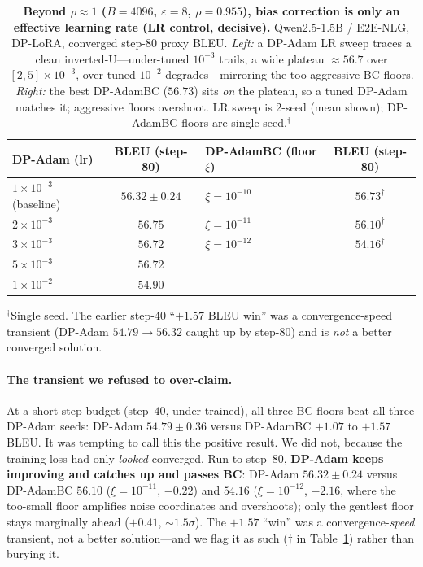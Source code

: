 \documentclass[11pt]{article}
\theoremstyle{plain}
\theoremstyle{definition}
\theoremstyle{remark}
\begin{document}
\begin{table}[t]
\centering
\caption{\textbf{Beyond $\rho\!\approx\!1$ ($B{=}4096$, $\varepsilon{=}8$, $\rho{=}0.955$),
bias correction is only an effective learning rate (LR control, decisive).} Qwen2.5-1.5B /
E2E-NLG, DP-LoRA, converged step-80 proxy BLEU. \emph{Left:} a DP-Adam LR sweep traces a clean
inverted-U---under-tuned $10^{-3}$ trails, a wide plateau $\approx\!56.7$ over $[2,5]\times10^{-3}$,
over-tuned $10^{-2}$ degrades---mirroring the too-aggressive BC floors. \emph{Right:} the best
DP-AdamBC ($56.73$) sits \emph{on} the plateau, so a tuned DP-Adam matches it; aggressive floors
overshoot. LR sweep is 2-seed (mean shown); DP-AdamBC floors are single-seed.$^{\dagger}$}
\label{tab:lr-control}
\begin{tabular}{lc@{\hskip 2.2em}lc}
\toprule
DP-Adam (lr) & BLEU (step-80) & DP-AdamBC (floor $\xi$) & BLEU (step-80) \\
\midrule
$1\times10^{-3}$ (baseline) & $56.32\pm0.24$ & $\xi{=}10^{-10}$ & $56.73^{\dagger}$ \\
$2\times10^{-3}$            & $56.75$        & $\xi{=}10^{-11}$ & $56.10^{\dagger}$ \\
$3\times10^{-3}$            & $56.72$        & $\xi{=}10^{-12}$ & $54.16^{\dagger}$ \\
$5\times10^{-3}$            & $56.72$        &                  &                  \\
$1\times10^{-2}$            & $54.90$        &                  &                  \\
\bottomrule
\end{tabular}
\par\smallskip
{\footnotesize $^{\dagger}$Single seed. The earlier step-40 ``$+1.57$ BLEU win'' was a
convergence-speed transient (DP-Adam $54.79\!\to\!56.32$ caught up by step-80) and is
\emph{not} a better converged solution.}
\end{table}

\paragraph{The transient we refused to over-claim.}
At a short step budget (step~$40$, under-trained), all three BC floors beat all three DP-Adam seeds:
DP-Adam $54.79\pm0.36$ versus DP-AdamBC $+1.07$ to $+1.57$ BLEU. It was tempting to call this the
positive result. We did not, because the training loss had only \emph{looked} converged. Run to
step~$80$, \textbf{DP-Adam keeps improving and catches up and passes BC}: DP-Adam $56.32\pm0.24$
versus DP-AdamBC $56.10$ ($\xi{=}10^{-11}$, $-0.22$) and $54.16$ ($\xi{=}10^{-12}$, $-2.16$, where the
too-small floor amplifies noise coordinates and overshoots); only the gentlest floor stays marginally
ahead ($+0.41$, $\sim1.5\sigma$). The $+1.57$ ``win'' was a convergence-\emph{speed} transient, not a
better solution---and we flag it as such ($\dagger$ in Table~\ref{tab:lr-control}) rather than burying
it.
\end{document}
